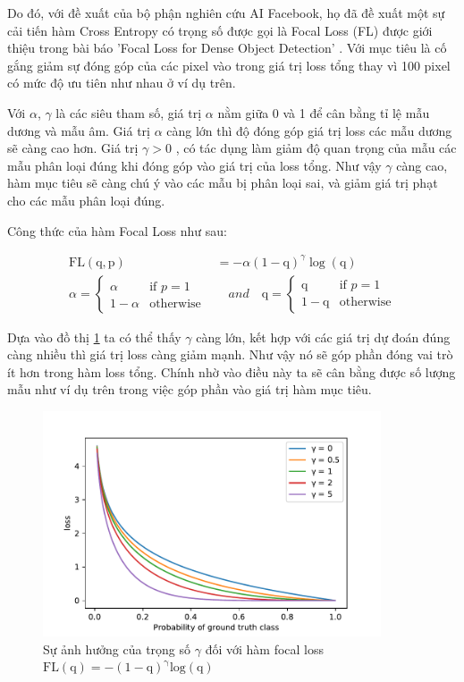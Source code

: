 Do đó, với đề xuất của bộ phận nghiên cứu AI Facebook, họ đã đề xuất một sự cải tiến hàm Cross Entropy có trọng số được gọi là Focal Loss  (FL) được giới thiệu trong bài báo 'Focal Loss for Dense Object Detection' \cite{focal}. Với mục tiêu là cố gắng giảm sự đóng góp của các pixel vào trong giá trị loss tổng thay vì 100 pixel có mức độ ưu tiên như nhau ở ví dụ trên.

Với $\alpha$, $\gamma$ là các siêu tham số, giá trị $\alpha$ nằm giữa 0 và 1 để cân bằng tỉ lệ mẫu dương và mẫu âm. Giá trị $\alpha$ càng lớn thì độ đóng góp giá trị loss các mẫu dương sẽ càng cao hơn. Giá trị $\gamma > 0$ , có tác dụng làm giảm độ quan trọng của mẫu các mẫu phân loại đúng khi đóng góp vào giá trị của loss tổng. Như vậy $\gamma$ càng cao, hàm mục tiêu sẽ càng chú ý vào các mẫu bị phân loại sai, và giảm giá trị phạt cho các mẫu phân loại đúng. 

Công thức của hàm Focal Loss như sau:

\begin{align}
    \mathrm{FL(q, p)} &= -\alpha(1-\mathrm{q})^\gamma \log(\mathrm{q})\\
    \nonumber
    \alpha = \begin{cases} 
                    \alpha & \text{if } p = 1 \\
                    1-\alpha & \text{otherwise}
                \end{cases}
    &\quad and \quad
    \mathrm{q} = \begin{cases} 
              \mathrm{q} & \text{if } p = 1 \\
              1-\mathrm{q} & \text{otherwise}
          \end{cases}
\end{align}

Dựa vào đồ thị \ref{Focal-effective-weight} ta có thể thấy $\gamma$ càng lớn, kết hợp với các giá trị dự đoán đúng càng nhiều thì giá trị loss càng giảm mạnh. Như vậy nó sẽ góp phần đóng vai trò ít hơn trong hàm loss tổng. Chính nhờ vào điều này ta sẽ cân bằng được số lượng mẫu như ví dụ trên trong việc góp phần vào giá trị hàm mục tiêu.
\begin{figure}[H]
    \centering
    \includegraphics[width=10cm]{images/blood/focal.pdf}
    \caption{Sự ảnh hưởng của trọng số $\gamma$ đối với hàm focal loss $\mathrm{FL(q)=-(1-q)^\gamma \mathrm{log}(q)}$ }
    \label{Focal-effective-weight}
\end{figure}

